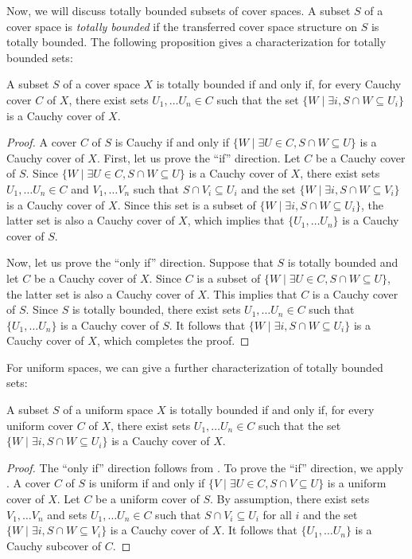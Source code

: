 \documentclass[reqno]{amsart}
\theoremstyle{definition}
\theoremstyle{remark}
\numberwithin{figure}{section}
\begin{document}
Now, we will discuss totally bounded subsets of cover spaces.
A subset $S$ of a cover space is \emph{totally bounded} if the transferred cover space structure on $S$ is totally bounded.
The following proposition gives a characterization for totally bounded sets:

\begin{prop}
A subset $S$ of a cover space $X$ is totally bounded if and only if, for every Cauchy cover $C$ of $X$, there exist sets $U_1, \ldots U_n \in C$ such that the set $\{ W \mid \exists i, S \cap W \subseteq U_i \}$ is a Cauchy cover of $X$.
\end{prop}
\begin{proof}
A cover $C$ of $S$ is Cauchy if and only if $\{ W \mid \exists U \in C, S \cap W \subseteq U \}$ is a Cauchy cover of $X$.
First, let us prove the ``if'' direction.
Let $C$ be a Cauchy cover of $S$.
Since $\{ W \mid \exists U \in C, S \cap W \subseteq U \}$ is a Cauchy cover of $X$, there exist sets $U_1, \ldots U_n \in C$ and $V_1, \ldots V_n$ such that $S \cap V_i \subseteq U_i$ and the set $\{ W \mid \exists i, S \cap W \subseteq V_i \}$ is a Cauchy cover of $X$.
Since this set is a subset of $\{ W \mid \exists i, S \cap W \subseteq U_i \}$, the latter set is also a Cauchy cover of $X$, which implies that $\{ U_1, \ldots U_n \}$ is a Cauchy cover of $S$.

Now, let us prove the ``only if'' direction.
Suppose that $S$ is totally bounded and let $C$ be a Cauchy cover of $X$.
Since $C$ is a subset of $\{ W \mid \exists U \in C, S \cap W \subseteq U \}$, the latter set is also a Cauchy cover of $X$.
This implies that $C$ is a Cauchy cover of $S$.
Since $S$ is totally bounded, there exist sets $U_1, \ldots U_n \in C$ such that $\{ U_1, \ldots U_n \}$ is a Cauchy cover of $S$.
It follows that $\{ W \mid \exists i, S \cap W \subseteq U_i \}$ is a Cauchy cover of $X$, which completes the proof.
\end{proof}

For uniform spaces, we can give a further characterization of totally bounded sets:

\begin{prop}
A subset $S$ of a uniform space $X$ is totally bounded if and only if, for every uniform cover $C$ of $X$, there exist sets $U_1, \ldots U_n \in C$ such that the set $\{ W \mid \exists i, S \cap W \subseteq U_i \}$ is a Cauchy cover of $X$.
\end{prop}
\begin{proof}
The ``only if'' direction follows from .
To prove the ``if'' direction, we apply .
A cover $C$ of $S$ is uniform if and only if $\{ V \mid \exists U \in C, S \cap V \subseteq U \}$ is a uniform cover of $X$.
Let $C$ be a uniform cover of $S$.
By assumption, there exist sets $V_1, \ldots V_n$ and sets $U_1, \ldots U_n \in C$ such that $S \cap V_i \subseteq U_i$ for all $i$ and the set $\{ W \mid \exists i, S \cap W \subseteq V_i \}$ is a Cauchy cover of $X$.
It follows that $\{ U_1, \ldots U_n \}$ is a Cauchy subcover of $C$.
\end{proof}
\end{document}
